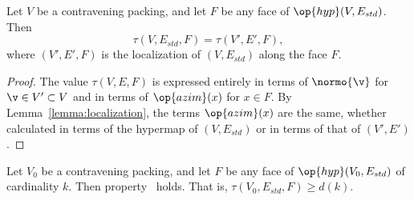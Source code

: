 \begin{lemma}[]\cutrate{}  \label{lemma:tau-local}
  Let $V$ be a contravening packing, and
  let $F$ be any face of $\op{hyp}(V,E_{std})$.  Then
\[ 
\tau(V,E_{std},F) = \tau(V',E',F),
\] 
where $(V',E',F)$ is the localization of $(V,E_{std})$ along the face $F$.
\end{lemma}

\begin{proof} The value $\tau(V,E,F)$ is expressed entirely in terms
  of $\normo{\v}$ for $\v\in V'\subset V$ and in terms of
  $\op{azim}(x)$ for $x\in F$.  By Lemma~\ref{lemma:localization},
  the terms $\op{azim}(x)$ are the same, whether calculated in terms
  of the hypermap of $(V,E_{std})$ or in terms of that of $(V',E')$.
\end{proof}










%






\begin{lemma}[]\label{lemma:main} 
Let $V_0$ be a contravening packing, and let $F$ be any
face of $\op{hyp}(V_0,E_{std})$ of cardinality $k$.  Then
 property~ holds.  
That is,
$\tau(V_0,E_{std},F) \ge d(k)$.
\end{lemma}
%
%




